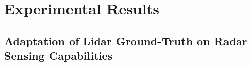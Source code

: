 \chapter{Experimental Results}
\label{ch:experimental_results}

%
\section{Adaptation of Lidar Ground-Truth on Radar Sensing Capabilities}
\label{sec:adaptation_of_lidar_on_radar}
\begin{figure}
	\begin{center}
		
	\end{center}
\end{figure}  

%
